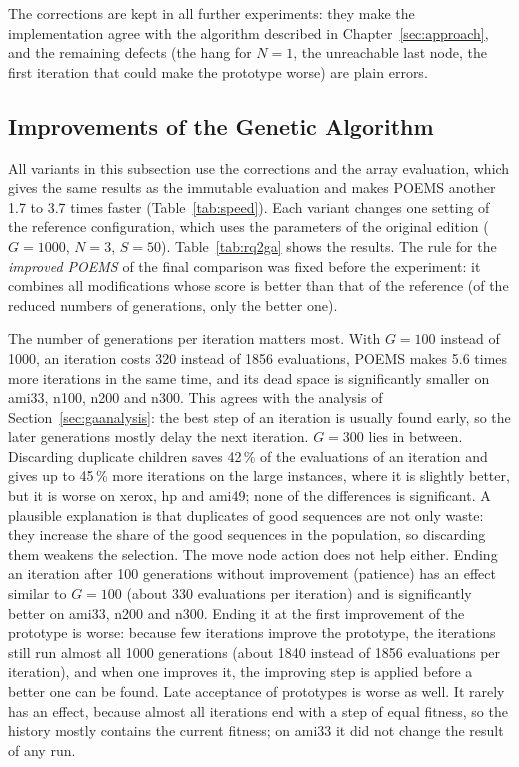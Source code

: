 

The corrections are kept in all further experiments: they make the implementation agree with the algorithm described in Chapter~\ref{sec:approach}, and the remaining defects (the hang for $N = 1$, the unreachable last node, the first iteration that could make the prototype worse) are plain errors.

\subsection{Improvements of the Genetic Algorithm}

All variants in this subsection use the corrections and the array evaluation, which gives the same results as the immutable evaluation and makes POEMS another 1.7 to 3.7 times faster (Table~\ref{tab:speed}). Each variant changes one setting of the reference configuration, which uses the parameters of the original edition ($G = 1000$, $N = 3$, $S = 50$). Table~\ref{tab:rq2ga} shows the results. The rule for the {\em improved POEMS} of the final comparison was fixed before the experiment: it combines all modifications whose score is better than that of the reference (of the reduced numbers of generations, only the better one).



The number of generations per iteration matters most. With $G = 100$ instead of 1000, an iteration costs 320 instead of 1856 evaluations, POEMS makes 5.6 times more iterations in the same time, and its dead space is significantly smaller on ami33, n100, n200 and n300. This agrees with the analysis of Section~\ref{sec:gaanalysis}: the best step of an iteration is usually found early, so the later generations mostly delay the next iteration. $G = 300$ lies in between. Discarding duplicate children saves 42\,\% of the evaluations of an iteration and gives up to 45\,\% more iterations on the large instances, where it is slightly better, but it is worse on xerox, hp and ami49; none of the differences is significant. A plausible explanation is that duplicates of good sequences are not only waste: they increase the share of the good sequences in the population, so discarding them weakens the selection. The move node action does not help either. Ending an iteration after 100 generations without improvement (patience) has an effect similar to $G = 100$ (about 330 evaluations per iteration) and is significantly better on ami33, n200 and n300. Ending it at the first improvement of the prototype is worse: because few iterations improve the prototype, the iterations still run almost all 1000 generations (about 1840 instead of 1856 evaluations per iteration), and when one improves it, the improving step is applied before a better one can be found. Late acceptance of prototypes is worse as well. It rarely has an effect, because almost all iterations end with a step of equal fitness, so the history mostly contains the current fitness; on ami33 it did not change the result of any run.

